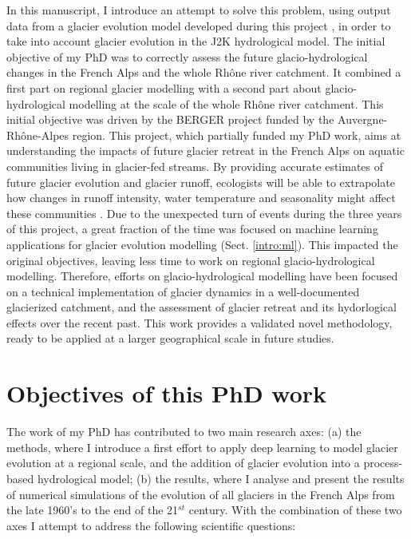 In this manuscript, I introduce an attempt to solve this problem, using output data from a glacier evolution model developed during this project \citep{bolibar_alpgm_2020}, in order to take into account glacier evolution in the J2K hydrological model. The initial objective of my PhD was to correctly assess the future glacio-hydrological changes in the French Alps and the whole Rhône river catchment. It combined a first part on regional glacier modelling with a second part about glacio-hydrological modelling at the scale of the whole Rhône river catchment. This initial objective was driven by the BERGER project funded by the Auvergne-Rhône-Alpes region. This project, which partially funded my PhD work, aims at understanding the impacts of future glacier retreat in the French Alps on aquatic communities living in glacier-fed streams. By providing accurate estimates of future glacier evolution and glacier runoff, ecologists will be able to extrapolate how changes in runoff intensity, water temperature and seasonality might affect these communities \citep{robinson_ecosystem_2014, cauvy-fraunie_global_2019}. Due to the unexpected turn of events during the three years of this project, a great fraction of the time was focused on machine learning applications for glacier evolution modelling (Sect. \ref{intro:ml}). This impacted the original objectives, leaving less time to work on regional glacio-hydrological modelling. Therefore, efforts on glacio-hydrological modelling have been focused on a technical implementation of glacier dynamics in a well-documented glacierized catchment, and the assessment of glacier retreat and its hydorlogical effects over the recent past. This work provides a validated novel methodology, ready to be applied at a larger geographical scale in future studies.

\section*{Objectives of this PhD work}

The work of my PhD has contributed to two main research axes: (a) the methods, where I introduce a first effort to apply deep learning to model glacier evolution at a regional scale, and the addition of glacier evolution into a process-based hydrological model; (b) the results, where I analyse and present the results of numerical simulations of the evolution of all glaciers in the French Alps from the late 1960's to the end of the 21$^{st}$ century. With the combination of these two axes I attempt to address the following scientific questions:
 
